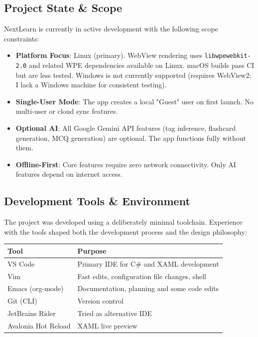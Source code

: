 \documentclass[14pt]{article}
\begin{document}
\subsection{Project State \& Scope}
\label{sec:org8dac427}
NextLearn is currently in active development with the following scope
constraints:

\begin{itemize}
\item \textbf{\textbf{Platform Focus}}: Linux (primary). WebView rendering uses
\texttt{libwpewebkit-2.0} and related WPE dependencies available on Linux.
macOS builds pass CI but are less tested. Windows is not currently
supported (requires WebView2; I lack a Windows machine for
consistent testing).

\item \textbf{\textbf{Single-User Mode}}: The app creates a local "Guest" user on first
launch. No multi-user or cloud sync features.

\item \textbf{\textbf{Optional AI}}: All Google Gemini API features (tag inference,
flashcard generation, MCQ generation) are optional. The app functions
fully without them.

\item \textbf{\textbf{Offline-First}}: Core features require zero network connectivity.
Only AI features depend on internet access.
\end{itemize}
\subsection{Development Tools \& Environment}
\label{sec:org6985c05}
The project was developed using a deliberately minimal toolchain.
Experience with the tools shaped both the development process and the
design philosophy:

\begin{center}
\begin{tabular}{ll}
Tool & Purpose\\
\hline
VS Code & Primary IDE for C\# and XAML development\\
Vim & Fast edits, configuration file changes, shell\\
Emacs (org-mode) & Documentation, planning and some code edits\\
Git (CLI) & Version control\\
JetBrains Rider & Tried as alternative IDE\\
Avalonia Hot Reload & XAML live preview\\
\end{tabular}
\end{center}
\end{document}
